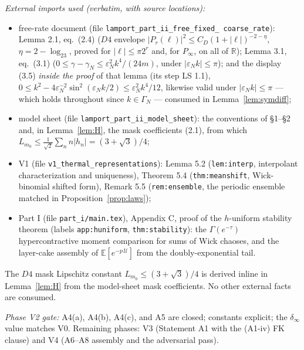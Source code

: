 \documentclass[11pt,a4paper]{article}
\theoremstyle{plain}
\theoremstyle{definition}
\newcommand{\R}{\mathbb{R}}
\newcommand{\E}{\mathbb{E}}
\newcommand{\eps}{\varepsilon}
\newcommand{\U}{\mathcal U}
\begin{document}
\medskip
\noindent\emph{External imports used (verbatim, with source locations):}
\begin{itemize}
\item free-rate document (file \texttt{lamport\_part\_ii\_free\_fixed\_%
coarse\_rate}): Lemma 2.1, eq.\ (2.4) ($D4$ envelope
$|P_r(\ell)|^2\le C_D(1+|\ell|)^{-2-\eta}$, $\eta=2-\log_23$, proved for
$|\ell|\le\pi2^r$ and, for $P_\infty$, on all of $\R$); Lemma 3.1, eq.\ (3.1)
($0\le\gamma-\gamma_N\le\eps_N^2k^4/(24m)$, under $|\eps_Nk|\le\pi$); and the display
(3.5) \emph{inside the proof} of that lemma (its step LS 1.1),
$0\le k^2-4\eps_N^{-2}\sin^2(\eps_Nk/2)\le\eps_N^2k^4/12$, likewise valid under
$|\eps_Nk|\le\pi$ --- which holds throughout since $k\in\Gamma_N$ --- consumed in
Lemma~\ref{lem:symdiff};
\item model sheet (file \texttt{lamport\_part\_ii\_model\_sheet}): the conventions of
\S1--\S2 and, in Lemma~\ref{lem:H}, the mask coefficients (2.1), from which
$L_{m_0}\le\tfrac1{\sqrt2}\sum_n n|h_n|=(3+\sqrt3)/4$;
\item V1 (file \texttt{v1\_thermal\_representations}): Lemma 5.2
(\texttt{lem:interp}, interpolant characterization and uniqueness),
Theorem 5.4 (\texttt{thm:meanshift}, Wick-binomial shifted form), Remark
5.5 (\texttt{rem:ensemble}, the periodic ensemble matched in
Proposition~\ref{prop:laws});
\item Part I (file \texttt{part\_i/main.tex}), Appendix C, proof of the
$h$-uniform stability theorem (labels \texttt{app:huniform},
\texttt{thm:stability}): the $\Gamma(e^{-\tau})$ hypercontractive moment
comparison for sums of Wick chaoses, and the layer-cake assembly of
$\E[e^{-p\,\U}]$ from the doubly-exponential tail.
\end{itemize}
The $D4$ mask Lipschitz constant
$L_{m_0}\le(3+\sqrt3)/4$ is derived inline in Lemma~\ref{lem:H} from the
model-sheet mask coefficients. No other external facts are consumed.

\noindent\emph{Phase V2 gate:} A4(a), A4(b), A4(c), and A5 are closed;
constants explicit; the $\delta_\infty$ value matches V0. Remaining phases:
V3 (Statement A1 with the (A1-iv) FK clause) and V4 (A6--A8 assembly and the
adversarial pass).
\end{document}
